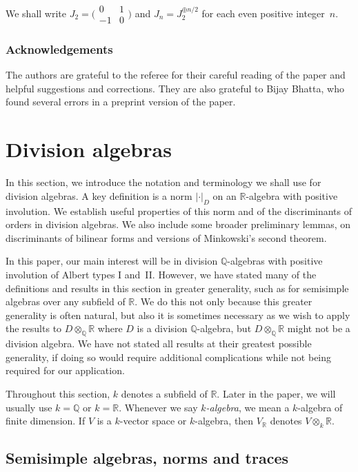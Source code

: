 \documentclass[11pt]{article}
\numberwithin{equation}{section}
\newcommand{\bQ}{\mathbb{Q}}
\newcommand{\bR}{\mathbb{R}}
\newcommand{\abs}[1]{\lvert #1 \rvert}
\newcommand{\fullsmallmatrix}[4]{\bigl( \begin{smallmatrix} #1 & #2 \\ #3 & #4 \end{smallmatrix} \bigr)}
\newcommand{\defterm}[1]{\emph{#1}}
\begin{document}
We shall write $J_2 = \fullsmallmatrix{0}{1}{-1}{0}$ and $J_n = J_2^{\oplus n/2}$ for each even positive integer~$n$.

\subsubsection*{Acknowledgements}
The authors are grateful to the referee for their careful reading of the paper and helpful suggestions and corrections.
They are also grateful to Bijay Bhatta, who found several errors in a preprint version of the paper.

\section{Division algebras}
\label{sec:division-algebras}

In this section, we introduce the notation and terminology we shall use for division algebras. A key definition is a norm $\abs{\cdot}_D$ on an $\bR$-algebra with positive involution. We establish useful properties of this norm and of the discriminants of orders in division algebras.
We also include some broader preliminary lemmas, on discriminants of bilinear forms and versions of Minkowski's second theorem.

In this paper, our main interest will be in division $\bQ$-algebras with positive involution of Albert types I and~II.
However, we have stated many of the definitions and results in this section in greater generality, such as for semisimple algebras over any subfield of $\bR$.
We do this not only because this greater generality is often natural, but also it is sometimes necessary as we wish to apply the results to $D \otimes_\bQ \bR$ where $D$ is a division $\bQ$-algebra, but $D \otimes_\bQ \bR$ might not be a division algebra.
We have not stated all results at their greatest possible generality, if doing so would require additional complications while not being required for our application.

Throughout this section, $k$ denotes a subfield of $\bR$.
Later in the paper, we will usually use $k = \bQ$ or $k = \bR$.
Whenever we say \defterm{$k$-algebra}, we mean a $k$-algebra of finite dimension.
If $V$ is a $k$-vector space or $k$-algebra, then $V_\bR$ denotes $V \otimes_k \bR$.

\subsection{Semisimple algebras, norms and traces} \label{subsec:semisimple-algebras}
\end{document}
